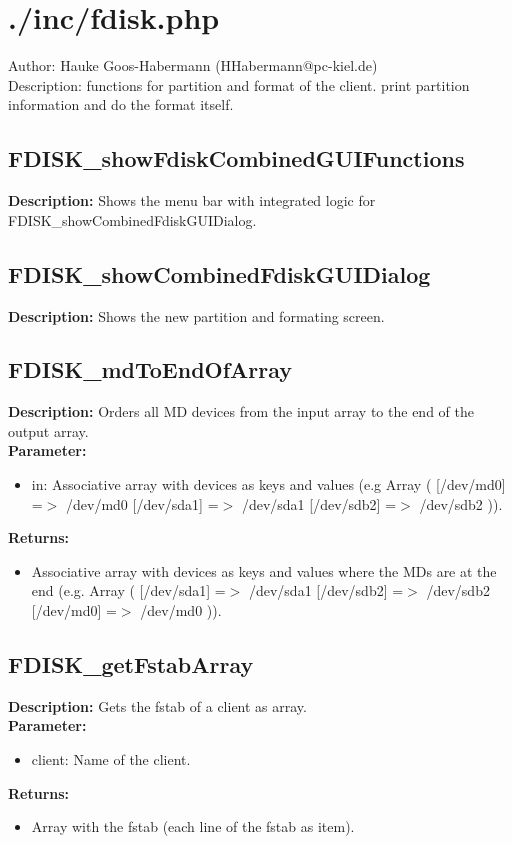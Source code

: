 \newpage\section{./inc/fdisk.php}
 Author: Hauke Goos-Habermann (HHabermann@pc-kiel.de)\\
 Description: functions for partition and format of the client. print partition information and do the format itself.\\

\subsection{FDISK\_showFdiskCombinedGUIFunctions}
\textbf{Description:} Shows the menu bar with integrated logic for FDISK\_showCombinedFdiskGUIDialog.\\

\subsection{FDISK\_showCombinedFdiskGUIDialog}
\textbf{Description:} Shows the new partition and formating screen.\\

\subsection{FDISK\_mdToEndOfArray}
\textbf{Description:} Orders all MD devices from the input array to the end of the output array.\\
\textbf{Parameter:}
\begin{itemize}
\item in: Associative array with devices as keys and values (e.g Array ( [/dev/md0] =$>$ /dev/md0 [/dev/sda1] =$>$ /dev/sda1 [/dev/sdb2] =$>$ /dev/sdb2 )).
\end{itemize}
\textbf{Returns:}
\begin{itemize}
\item Associative array with devices as keys and values where the MDs are at the end (e.g. Array ( [/dev/sda1] =$>$ /dev/sda1 [/dev/sdb2] =$>$ /dev/sdb2 [/dev/md0] =$>$ /dev/md0 )).
\end{itemize}

\subsection{FDISK\_getFstabArray}
\textbf{Description:} Gets the fstab of a client as array.\\
\textbf{Parameter:}
\begin{itemize}
\item client: Name of the client.
\end{itemize}
\textbf{Returns:}
\begin{itemize}
\item Array with the fstab (each line of the fstab as item).
\end{itemize}

